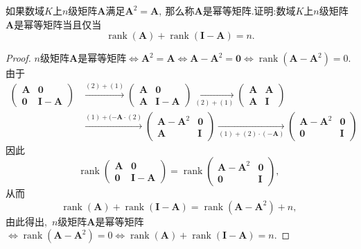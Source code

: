 \newpage
\begin{problem}
	如果数域$K$上$n$级矩阵$\boldsymbol{A}$满足$\boldsymbol{A}^2=\boldsymbol{A},\ $那么称$\boldsymbol{A}$是幂等矩阵.证明:数域$K$上$n$级矩阵$\boldsymbol{A}$是幂等矩阵当且仅当
	$$\operatorname{rank}(\boldsymbol{A})+\operatorname{rank}(\boldsymbol{I}-\boldsymbol{A})=n.$$
\end{problem}
\begin{proof}
	$n$级矩阵$\boldsymbol{A}$是幂等矩阵$\Longleftrightarrow\boldsymbol{A}^2=\boldsymbol{A}\Longleftrightarrow\boldsymbol{A}-\boldsymbol{A}^2=\boldsymbol{0}\Longleftrightarrow\operatorname{rank}(\boldsymbol{A}-\boldsymbol{A}^2)=0.$由于
	$$\begin{aligned}
		\begin{pmatrix}
			\boldsymbol{A} & \boldsymbol{0}\\
			\boldsymbol{0} & \boldsymbol{I-A}
		\end{pmatrix}&\xrightarrow[]{(2)+(1)}
		\begin{pmatrix}
			\boldsymbol{A} & \boldsymbol{0}\\
			\boldsymbol{A} & \boldsymbol{I-A}
		\end{pmatrix}\xrightarrow[(2)+(1)]{}
		\begin{pmatrix}
			\boldsymbol{A} & \boldsymbol{A}\\
			\boldsymbol{A} & \boldsymbol{I}
		\end{pmatrix}\\
		&\xrightarrow[]{(1)+(-\boldsymbol{A}\cdot (2)}
		\begin{pmatrix}
			\boldsymbol{A}-\boldsymbol{A}^2& \boldsymbol{0}\\
			\boldsymbol{A} 				   & \boldsymbol{I}
		\end{pmatrix}\xrightarrow[(1)+(2)\cdot (-\boldsymbol{A})]{}
		\begin{pmatrix}
			\boldsymbol{A}-\boldsymbol{A}^2& \boldsymbol{0}\\
			\boldsymbol{0} 				   & \boldsymbol{I}
		\end{pmatrix}
	\end{aligned}$$
	因此
	$$\operatorname{rank}\begin{pmatrix}
		\boldsymbol{A} & \boldsymbol{0}\\
		\boldsymbol{0} & \boldsymbol{I-A}
	\end{pmatrix}=\operatorname{rank}\begin{pmatrix}
		\boldsymbol{A}-\boldsymbol{A}^2& \boldsymbol{0}\\
		\boldsymbol{0} 				   & \boldsymbol{I}
	\end{pmatrix},\ $$
	从而
	$$\operatorname{rank}(\boldsymbol{A})+\operatorname{rank}(\boldsymbol{I-A})=\operatorname{rank}(\boldsymbol{A}-\boldsymbol{A}^2)+n,\ $$
	由此得出,\ $n$级矩阵$\boldsymbol{A}$是幂等矩阵$\Longleftrightarrow\operatorname{rank}(\boldsymbol{A}-\boldsymbol{A}^2)=0\Longleftrightarrow\operatorname{rank}(\boldsymbol{A})+\operatorname{rank}(\boldsymbol{I-A})=n.$
\end{proof}
